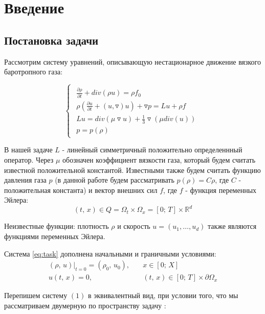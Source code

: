 \section{Введение}
\subsection{Постановка задачи}

Рассмотрим систему уравнений, описывающую нестационарное  движение вязкого баротропного газа:

\begin{equation} \label{eq:task}
	\begin{cases}
		\begin{array}{l}
			\frac{\partial \rho}{\partial t} + div(\rho u) = \rho f_0\\
			\rho \left(\frac{\partial u}{\partial t} + (u, \triangledown)u\right) + \triangledown p = Lu + \rho f\\
			Lu = div(\mu \triangledown u) + \frac{1}{3}\triangledown(\mu div(u)) \\
			p = p(\rho)
		\end{array}
	\end{cases}
\end{equation}

В нашей задаче $L$ - линейный симметричный положительно определеннный оператор. Через $\mu$ обозначен коэффициент вязкости газа, который будем считать известной положительной константой. Известными также будем считать функцию давления газа $p$ (в данной работе будем рассматривать $p(\rho) = C\rho$, где $C$ - положительная константа) и вектор внешних сил $f$, где $f$ - функция переменных Эйлера: $$(t, \, x) \in Q = \Omega_t \times \Omega_x = [0; \, T] \times \mathbb{R}^d$$

Неизвестные функции: плотность $\rho$ и скорость $u = (u_1,\dots,u_d)$ также являются функциями переменных Эйлера.

Система \eqref{eq:task} дополнена начальными и граничными условиями:
\begin{equation} \label{eq:terms}
	\begin{array}{lc}
		(\rho, \, u)|_{t = 0} = (\rho_0, \, u_0), &\quad x \in [0; \, X] \\
		u (t, \, x) = 0, &\quad (t, \, x) \in [0; \, T] \times \partial \Omega_x
	\end{array}
\end{equation}

Перепишем систему $(1)$ в эквивалентный вид, при условии того, что мы рассматриваем двумерную по пространству задачу : 

